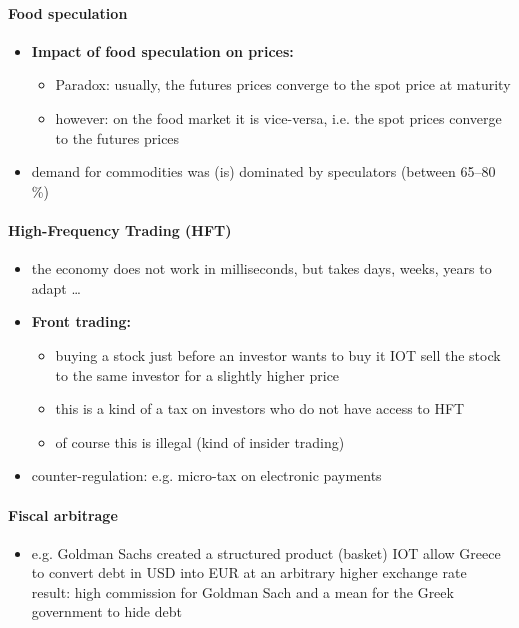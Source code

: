 \documentclass[a4paper,landscape,8pt,fleqn]{scrartcl}
\renewcommand{\emph}[1]{\textbf{#1}}
\begin{document}
\begin{multicols*}{4}
\paragraph{Food speculation}
\begin{itemize}
\item \emph{Impact of food speculation on prices:}
\begin{itemize}
\item Paradox: usually, the futures prices converge to the spot price at maturity
\item however: on the food market it is vice-versa, i.e. the spot prices converge to the futures prices
\end{itemize}
\item demand for commodities was (is) dominated by speculators (between 65--80 \%)
\end{itemize}

\paragraph{High-Frequency Trading (HFT)}
\begin{itemize}
\item the economy does not work in milliseconds, but takes days, weeks, years to adapt \ldots
\item \emph{Front trading:}
\begin{itemize}
\item buying a stock just before an investor wants to buy it IOT sell the stock to the same investor for a slightly higher price
\item this is a kind of a tax on investors who do not have access to HFT
\item of course this is illegal (kind of insider trading)
\end{itemize}
\item counter-regulation: e.g. micro-tax on electronic payments
\end{itemize}

\paragraph{Fiscal arbitrage}
\begin{itemize}
\item e.g. Goldman Sachs created a structured product (basket) IOT allow Greece to convert debt in USD into EUR at an arbitrary higher exchange rate \\
result: high commission for Goldman Sach and a mean for the Greek government to hide debt
\end{itemize}


\end{multicols*}
\end{document}
